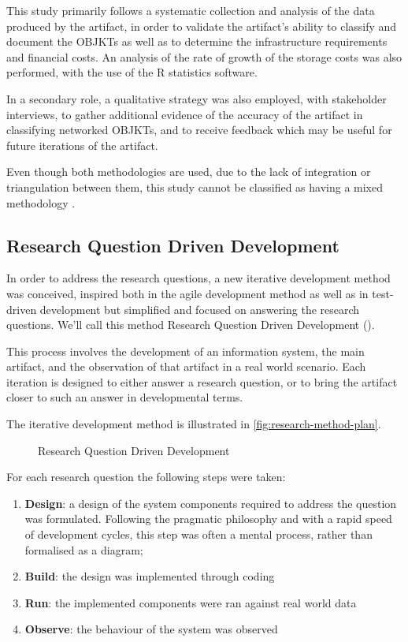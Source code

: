 This study primarily follows a systematic collection and analysis of the data produced by the artifact, in order to validate the artifact's ability to classify and document the OBJKTs as well as to determine the infrastructure requirements and financial costs. An analysis of the rate of growth of the storage costs was also performed, with the use of the R statistics software.

In a secondary role, a qualitative strategy was also employed, with stakeholder interviews, to gather additional evidence of the accuracy of the artifact in classifying networked OBJKTs, and to receive feedback which may be useful for future iterations of the artifact.

Even though both methodologies are used, due to the lack of integration or triangulation between them, this study cannot be classified as having a mixed methodology \cite{turnerResearchDesignMixed2017}.


\subsection{Research Question Driven Development}

In order to address the research questions, a new iterative development method was conceived, inspired both in the agile development method \cite{shoreArtAgileDevelopment2021} as well as in test-driven development \cite{beckTestdrivenDevelopmentExample2003} but simplified and focused on answering the research questions. We'll call this method Research Question Driven Development ().

This process involves the development of an information system, the main artifact, and the observation of that artifact in a real world scenario. Each iteration is designed to either answer a research question, or to bring the artifact closer to such an answer in developmental terms.

The iterative development method is illustrated in \autoref{fig:research-method-plan}.

\begin{figure}[h]
    \centering
    
    \caption[Research Question Driven Development]{Research Question Driven Development}
    \label{fig:research-method-plan}
\end{figure}

For each research question the following steps were taken:

\begin{enumerate}
    \item \textbf{Design}: a design of the system components required to address the question was formulated. Following the pragmatic philosophy and with a rapid speed of development cycles, this step was often a mental process, rather than formalised as a diagram;
    \item  \textbf{Build}: the design was implemented through coding
    \item  \textbf{Run}: the implemented components were ran against real world data
    \item  \textbf{Observe}: the behaviour of the system was observed
\end{enumerate}

